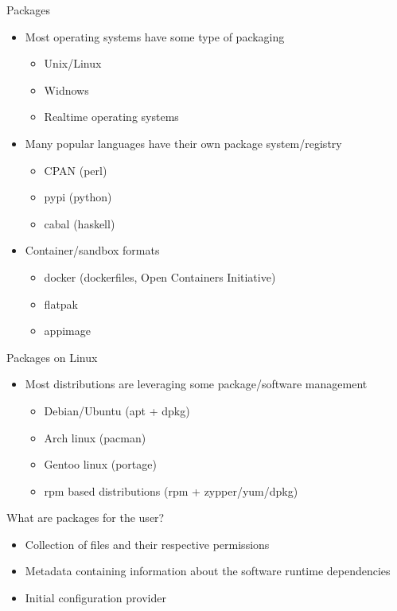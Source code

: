 \documentclass{beamer}
\begin{document}
\begin{frame}[t]{Packages}
	\begin{itemize}
	\item Most operating systems have some type of packaging
    \begin{itemize}
      \item Unix/Linux
      \item Widnows
      \item Realtime operating systems
    \end{itemize}
  \item Many popular languages have their own package system/registry
    \begin{itemize}
      \item CPAN (perl)
      \item pypi (python)
      \item cabal (haskell)
    \end{itemize}
    \item Container/sandbox formats
      \begin{itemize}
        \item docker (dockerfiles, Open Containers Initiative)
        \item flatpak
        \item appimage
      \end{itemize}
	\end{itemize}
\end{frame}

\begin{frame}[t]{Packages on Linux}
	\begin{itemize}
	\item Most distributions are leveraging some package/software management
    \begin{itemize}
      \item Debian/Ubuntu (apt + dpkg)
      \item Arch linux (pacman)
      \item Gentoo linux (portage)
      \item rpm based distributions (rpm + zypper/yum/dpkg)
    \end{itemize}
  \end{itemize}
\end{frame}


\begin{frame}[t]{What are packages for the user?}
	\begin{itemize}
	\item Collection of files and their respective permissions
	\item Metadata containing information about the software runtime dependencies
	\item Initial configuration provider
	\end{itemize}
\end{frame}
\end{document}
